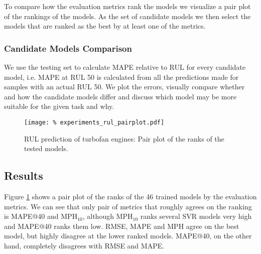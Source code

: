 To compare how the evaluation metrics rank the models we visualize a pair plot of the rankings of the models.
As the set of candidate models we then select the models that are ranked as the best by at least one of the metrics.

\subsubsection{Candidate Models Comparison}

We use the testing set to calculate MAPE relative to RUL for every candidate model, i.e. MAPE at RUL 50 is calculated from all the predictions made for samples with an actual RUL 50.
We plot the errors, visually compare whether and how the candidate models differ and discuss which model may be more suitable for the given task and why.

\begin{figure}
	\centering
    \texttt{[image: \%
        experiments\_rul\_pairplot.pdf]}
	\caption{RUL prediction of turbofan engines: Pair plot of the ranks of the tested models.}
	\label{fig:experiments_rul_pairplot}
\end{figure}

\subsection{Results}
\label{sec:experiment_rul_results}

Figure \ref{fig:experiments_rul_pairplot} shows a pair plot of the ranks of the 46 trained models by the evaluation metrics.
We can see that only pair of metrics that roughly agrees on the ranking is MAPE@40 and MPH$_{10}$, although MPH$_{10}$ ranks several SVR models very high and MAPE@40 ranks them low.
RMSE, MAPE and MPH agree on the best model, but highly disagree at the lower ranked models.
MAPE@40, on the other hand, completely disagrees with RMSE and MAPE.

